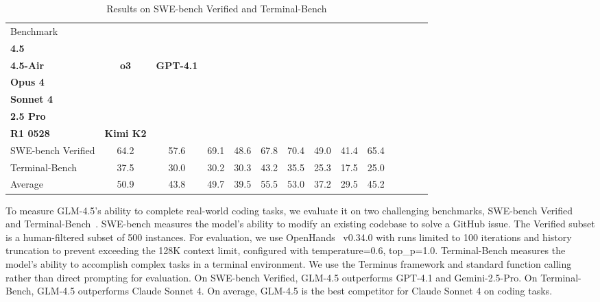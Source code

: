 \begin{table}[ht]
    \centering
    \footnotesize
    \caption{Results on SWE-bench Verified and Terminal-Bench}
    \begin{tabular}{@{}l@{\;\;}c@{\;\;\;}c@{\;\;\;}c@{\;\;}c@{\;\;\;}c@{\;\;\;}c@{\;\;\;}c@{\;\;\;}c@{\;\;\;}c@{\;\;\;}c@{\;\;\;}c@{\;\;\;}c@{\;}c@{}}
    \toprule
    Benchmark & \makecell[c]{\textbf{GLM-}\\\textbf{4.5}} & \makecell[c]{\textbf{GLM-}\\\textbf{4.5-Air}} & \textbf{o3} & \textbf{GPT-4.1} & \makecell[c]{\textbf{Claude}\\\textbf{Opus 4}} & \makecell[c]{\textbf{Claude}\\\textbf{Sonnet 4}} & \makecell[c]{\textbf{Gemini}\\\textbf{2.5 Pro}} & \makecell[c]{\textbf{DeepSeek}\\\textbf{R1 0528}} & \textbf{Kimi K2} \\
    \midrule
    SWE-bench Verified & 64.2 & 57.6 & 69.1 & 48.6 & 67.8 & 70.4 & 49.0 & 41.4 & 65.4 \\
    Terminal-Bench     & 37.5 & 30.0 & 30.2 & 30.3 & 43.2 & 35.5 & 25.3 & 17.5 & 25.0 \\
    \midrule
    Average & 50.9 & 43.8 & 49.7 & 39.5 & 55.5 & 53.0 & 37.2 & 29.5 & 45.2 \\
    \bottomrule
    \end{tabular}
    \label{tab:swe_terminal}
\end{table}

To measure GLM-4.5's ability to complete real-world coding tasks, we evaluate it on two challenging benchmarks, SWE-bench Verified~\cite{jimenez2023swe} and Terminal-Bench~\cite{tbench_2025}. SWE-bench measures the model's ability to modify an existing codebase to solve a GitHub issue. The Verified subset is a human-filtered subset of 500 instances. For evaluation, we use OpenHands~\cite{wang2025openhands} v0.34.0 with runs limited to 100 iterations and history truncation to prevent exceeding the 128K context limit, configured with temperature=0.6, top\_p=1.0. Terminal-Bench measures the model's ability to accomplish complex tasks in a terminal environment. We use the Terminus framework and standard function calling rather than direct prompting for evaluation. On SWE-bench Verified, GLM-4.5 outperforms GPT-4.1 and Gemini-2.5-Pro. On Terminal-Bench, GLM-4.5 outperforms Claude Sonnet 4. On average, GLM-4.5 is the best competitor for Claude Sonnet 4 on coding tasks.

